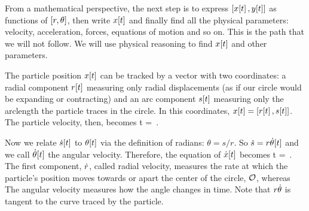 From a mathematical perspective, the next step is to express $\left[{x\!\left[{t}\right], y\!\left[{t}\right]}\right]$ as functions of $\left[{r,\theta}\right]$, then write $x\!\left[{t}\right]$ and finally find all the physical parameters: velocity, acceleration, forces, equations of motion and so on. This is the path that we will not follow. We will use physical reasoning to find $x\!\left[{t}\right]$ and other parameters.

The particle position $x\!\left[{t}\right]$ can be tracked by a vector with two coordinates: a radial component $r\!\left[{t}\right]$ measuring only radial displacements (as if our circle would be expanding or contracting) and an arc component $s\!\left[{t}\right]$ measuring only the arclength the particle traces in the circle. In this coordinates, $x\!\left[{t}\right] = \left[{r\!\left[{t}\right], s\!\left[{t}\right]}\right]$. The particle velocity, then, becomes
\beq
\dt\pvec\vat t =  \,.
\eeq

Now we relate $\dot{s}\!\left[{t}\right]$ to $\theta\!\left[{t}\right]$ via the definition of radians: $\theta = s/r$. So $\dot{s} = r\dot{\theta}\!\left[{t}\right]$ and we call $\dot{\theta}\!\left[{t}\right]$ the angular velocity. Therefore, the equation of $\dot{x}\!\left[{t}\right]$ becomes
\beq
\dt\pvec\vat t = \,.
\eeq
The first component, $\dot{r}$, called radial velocity, measures the rate at which the particle's position moves towards or apart the center of the circle, $\mathcal{O}$, whereas The angular velocity measures how the angle changes in time. Note that $r\dot{\theta}$ is tangent to the curve traced by the particle.
